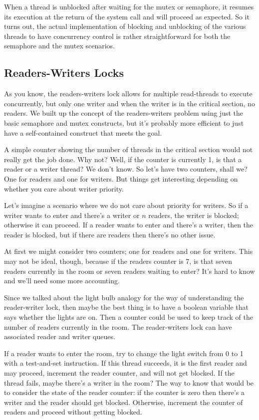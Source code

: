 When a thread is unblocked after waiting for the mutex or semaphore, it resumes its execution at the return of the system call and will proceed as expected. So it turns out, the actual implementation of blocking and unblocking of the various threads to have concurrency control is rather straightforward for both the semaphore and the mutex scenarios.


\subsection*{Readers-Writers Locks}

As you know, the readers-writers lock allows for multiple read-threads to execute concurrently, but only one writer and when the writer is in the critical section, no readers. We built up the concept of the readers-writers problem using just the basic semaphore and mutex constructs, but it's probably more efficient to just have a self-contained construct that meets the goal.

A simple counter showing the number of threads in the critical section would not really get the job done. Why not? Well, if the counter is currently 1, is that a reader or a writer thread? We don't know. So let's have two counters, shall we? One for readers and one for writers. But things get interesting depending on whether you care about writer priority. 

Let's imagine a scenario where we do not care about priority for writers. So if a writer wants to enter and there's a writer or $n$ readers, the writer is blocked; otherwise it can proceed. If a reader wants to enter and there's a writer, then the reader is blocked, but if there are readers then there's no other issue.

At first we might consider two counters; one for readers and one for writers. This may not be ideal, though, because if the readers counter is 7, is that seven readers currently in the room or seven readers waiting to enter? It's hard to know and we'll need some more accounting.

Since we talked about the light bulb analogy for the way of understanding the reader-writer lock, then maybe the best thing is to have a boolean variable that says whether the lights are on. Then a counter could be used to keep track of the number of readers currently in the room. The reader-writers lock can have associated reader and writer queues. 

If a reader wants to enter the room, try to change the light switch from 0 to 1 with a test-and-set instruction. If this thread succeeds, it is the first reader and may proceed, increment the reader counter, and will not get blocked. If the thread fails, maybe there's a writer in the room? The way to know that would be to consider the state of the reader counter: if the counter is zero then there's a writer and the reader should get blocked. Otherwise, increment the counter of readers and proceed without getting blocked.

